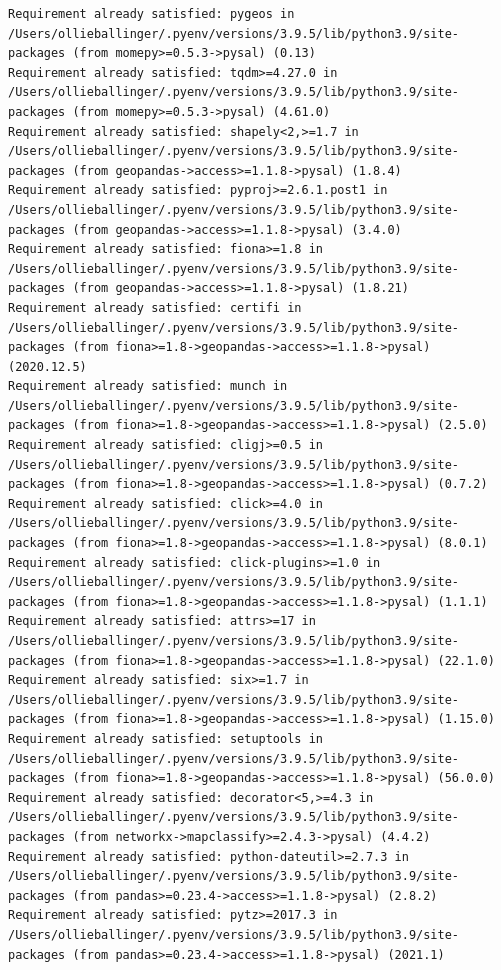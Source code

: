 \documentclass[
  letterpaper,
  DIV=11,
  numbers=noendperiod]{scrreprt}
\begin{document}
\begin{verbatim}
Requirement already satisfied: pygeos in /Users/ollieballinger/.pyenv/versions/3.9.5/lib/python3.9/site-packages (from momepy>=0.5.3->pysal) (0.13)
Requirement already satisfied: tqdm>=4.27.0 in /Users/ollieballinger/.pyenv/versions/3.9.5/lib/python3.9/site-packages (from momepy>=0.5.3->pysal) (4.61.0)
Requirement already satisfied: shapely<2,>=1.7 in /Users/ollieballinger/.pyenv/versions/3.9.5/lib/python3.9/site-packages (from geopandas->access>=1.1.8->pysal) (1.8.4)
Requirement already satisfied: pyproj>=2.6.1.post1 in /Users/ollieballinger/.pyenv/versions/3.9.5/lib/python3.9/site-packages (from geopandas->access>=1.1.8->pysal) (3.4.0)
Requirement already satisfied: fiona>=1.8 in /Users/ollieballinger/.pyenv/versions/3.9.5/lib/python3.9/site-packages (from geopandas->access>=1.1.8->pysal) (1.8.21)
Requirement already satisfied: certifi in /Users/ollieballinger/.pyenv/versions/3.9.5/lib/python3.9/site-packages (from fiona>=1.8->geopandas->access>=1.1.8->pysal) (2020.12.5)
Requirement already satisfied: munch in /Users/ollieballinger/.pyenv/versions/3.9.5/lib/python3.9/site-packages (from fiona>=1.8->geopandas->access>=1.1.8->pysal) (2.5.0)
Requirement already satisfied: cligj>=0.5 in /Users/ollieballinger/.pyenv/versions/3.9.5/lib/python3.9/site-packages (from fiona>=1.8->geopandas->access>=1.1.8->pysal) (0.7.2)
Requirement already satisfied: click>=4.0 in /Users/ollieballinger/.pyenv/versions/3.9.5/lib/python3.9/site-packages (from fiona>=1.8->geopandas->access>=1.1.8->pysal) (8.0.1)
Requirement already satisfied: click-plugins>=1.0 in /Users/ollieballinger/.pyenv/versions/3.9.5/lib/python3.9/site-packages (from fiona>=1.8->geopandas->access>=1.1.8->pysal) (1.1.1)
Requirement already satisfied: attrs>=17 in /Users/ollieballinger/.pyenv/versions/3.9.5/lib/python3.9/site-packages (from fiona>=1.8->geopandas->access>=1.1.8->pysal) (22.1.0)
Requirement already satisfied: six>=1.7 in /Users/ollieballinger/.pyenv/versions/3.9.5/lib/python3.9/site-packages (from fiona>=1.8->geopandas->access>=1.1.8->pysal) (1.15.0)
Requirement already satisfied: setuptools in /Users/ollieballinger/.pyenv/versions/3.9.5/lib/python3.9/site-packages (from fiona>=1.8->geopandas->access>=1.1.8->pysal) (56.0.0)
Requirement already satisfied: decorator<5,>=4.3 in /Users/ollieballinger/.pyenv/versions/3.9.5/lib/python3.9/site-packages (from networkx->mapclassify>=2.4.3->pysal) (4.4.2)
Requirement already satisfied: python-dateutil>=2.7.3 in /Users/ollieballinger/.pyenv/versions/3.9.5/lib/python3.9/site-packages (from pandas>=0.23.4->access>=1.1.8->pysal) (2.8.2)
Requirement already satisfied: pytz>=2017.3 in /Users/ollieballinger/.pyenv/versions/3.9.5/lib/python3.9/site-packages (from pandas>=0.23.4->access>=1.1.8->pysal) (2021.1)

\end{verbatim}
\end{document}
